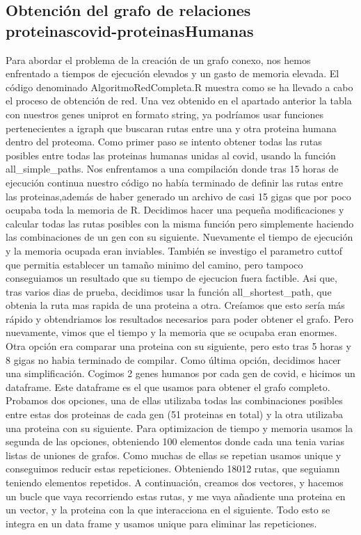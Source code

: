 \subsection{Obtención del grafo de relaciones proteinascovid-proteinasHumanas}

Para abordar el problema de la creación de un grafo conexo, nos hemos enfrentado a tiempos de ejecución elevados y un gasto de memoria elevada. 
El código denominado AlgoritmoRedCompleta.R muestra como se ha llevado a cabo el proceso de obtención de red. 
Una vez obtenido en el apartado anterior la tabla con nuestros genes uniprot en formato string, ya podríamos usar funciones pertenecientes a igraph que buscaran rutas entre una y otra proteina humana dentro del proteoma. 
Como primer paso se intento obtener todas las rutas posibles entre todas las proteinas humanas unidas al covid, usando la función all_simple_paths. 
Nos enfrentamos a una compilación donde tras 15 horas de ejecución continua nuestro código no había terminado de definir las rutas entre las proteinas,además de haber generado un archivo de casi 15 gigas que por poco ocupaba toda la memoria de R. 
Decidimos hacer una pequeña modificaciones y calcular todas las rutas posibles con la misma función pero simplemente haciendo las combinaciones de un gen con su siguiente. Nuevamente el tiempo de ejecución y la memoria ocupada eran inviables. 
También se investigo el parametro cuttof que permitia establecer un tamaño minimo del camino, pero tampoco conseguiamos un resultado que su tiempo de ejecucion fuera factible. 
Asi que, tras varios dias de prueba, decidimos usar la función all_shortest_path, que obtenia la ruta mas rapida de una proteina a otra. Creíamos que esto sería más rápido y obtendriamos los resultados necesarios para poder obtener el grafo. Pero nuevamente, vimos que el tiempo y la memoria que se ocupaba eran enormes. Otra opción era comparar una proteina con su siguiente, pero esto tras 5 horas y 8 gigas no habia terminado de compilar. 
Como última opción, decidimos hacer una simplificación. Cogimos 2 genes humanos por cada gen de covid, e hicimos un dataframe. Este dataframe es el que usamos para obtener el grafo completo. 
Probamos dos opciones, una de ellas utilizaba todas las combinaciones posibles entre estas dos proteinas de cada gen (51 proteinas en total) y la otra utilizaba una proteina con su siguiente. Para optimizacion de tiempo y memoria usamos la segunda de las opciones, obteniendo 100 elementos donde cada una tenia varias listas de uniones de grafos. Como muchas de ellas se repetian usamos unique y conseguimos reducir estas repeticiones. Obteniendo 18012 rutas, que seguiamn teniendo elementos repetidos. A continuación, creamos dos vectores, y hacemos un bucle que vaya recorriendo estas rutas, y me vaya añadiente una proteina en un vector, y la proteina con la que interacciona en el siguiente. Todo esto se integra en un data frame y usamos unique para eliminar las repeticiones. 
